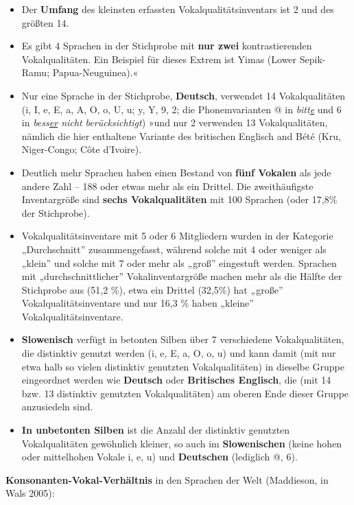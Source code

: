 \documentclass[
  letterpaper,
]{scrbook}
\begin{document}
\begin{itemize}
\item
  Der \textbf{Umfang} des kleinsten erfassten Vokalqualitätsinventars
  ist 2 und des größten 14.
\item
  Es gibt 4 Sprachen in der Stichprobe mit \textbf{nur zwei}
  kontrastierenden Vokalqualitäten. Ein Beispiel für dieses Extrem ist
  Yimas (Lower Sepik-Ramu; Papua-Neuguinea).«
\item
  Nur eine Sprache in der Stichprobe, \textbf{Deutsch}, verwendet 14
  Vokalqualitäten (i, I, e, E, a, A, O, o, U, u; y, Y, 9, 2; die
  Phonemvarianten @ in \emph{bitt\uline{e}} und 6 in
  \emph{bess\uline{er} nicht berücksichtigt}) »und nur 2 verwenden 13
  Vokalqualitäten, nämlich die hier enthaltene Variante des britischen
  Englisch and Bété (Kru, Niger-Congo; Côte d'Ivoire).
\item
  Deutlich mehr Sprachen haben einen Bestand von \textbf{fünf Vokalen}
  als jede andere Zahl -- 188 oder etwas mehr als ein Drittel. Die
  zweithäufigste Inventargröße sind \textbf{sechs Vokalqualitäten} mit
  100 Sprachen (oder 17,8\% der Stichprobe).
\item
  Vokalqualitätsinventare mit 5 oder 6 Mitgliedern wurden in der
  Kategorie „Durchschnitt'' zusammengefasst, während solche mit 4 oder
  weniger als „klein'' und solche mit 7 oder mehr als „groß'' eingestuft
  werden. Sprachen mit „durchschnittlicher'' Vokalinventargröße machen
  mehr als die Hälfte der Stichprobe aus (51,2 \%), etwa ein Drittel
  (32,5\%) hat „große'' Vokalqualitätsinventare und nur 16,3 \% haben
  „kleine'' Vokalqualitätsinventare.
\item
  \textbf{Slowenisch} verfügt in betonten Silben über 7 verschiedene
  Vokalqualitäten, die distinktiv genutzt werden (i, e, E, a, O, o, u)
  und kann damit (mit nur etwa halb so vielen distinktiv genutzten
  Vokalqualitäten) in dieselbe Gruppe eingeordnet werden wie
  \textbf{Deutsch} oder \textbf{Britisches Englisch}, die (mit 14 bzw.
  13 distinktiv genutzten Vokalqualitäten) am oberen Ende dieser Gruppe
  anzusiedeln sind.
\item
  \textbf{In unbetonten Silben} ist die Anzahl der distinktiv genutzten
  Vokalqualitäten gewöhnlich kleiner, so auch im \textbf{Slowenischen}
  (keine hohen oder mittelhohen Vokale i, e, u) und \textbf{Deutschen}
  (lediglich @, 6).
\end{itemize}

\textbf{Konsonanten-Vokal-Verhältnis} in den Sprachen der Welt
(Maddieson, in Wals 2005):
\end{document}
